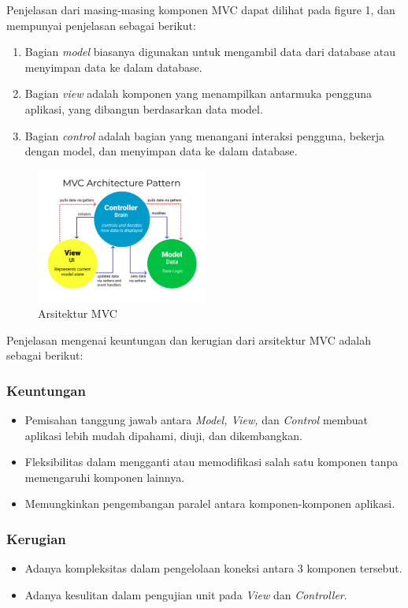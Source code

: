 \documentclass[conference]{IEEEtran}
\begin{document}
	Penjelasan dari masing-masing komponen MVC dapat dilihat pada figure 1, dan mempunyai penjelasan sebagai berikut:
	\begin{enumerate}[label=\alph*]
		\item Bagian \textit{model} biasanya digunakan untuk mengambil data dari database atau menyimpan data ke dalam database. 
		\item Bagian \textit{view} adalah komponen yang menampilkan antarmuka pengguna aplikasi, yang dibangun berdasarkan data model. 
		\item Bagian \textit{control} adalah bagian yang menangani interaksi pengguna, bekerja dengan model, dan menyimpan data ke dalam database.
	\end{enumerate}
	
	\begin{figure}[h]
		\centering
		\includegraphics[width=0.5\textwidth]{images/MVC3}
		\caption{Arsitektur MVC}
		\label{fig:class_mvvm}
	\end{figure}
	
	Penjelasan mengenai keuntungan dan kerugian dari arsitektur MVC adalah sebagai berikut:
	\subsubsection{Keuntungan}
	\begin{itemize}
		\item Pemisahan tanggung jawab antara \textit{Model, View,} dan \textit{Control} membuat aplikasi lebih mudah dipahami, diuji, dan dikembangkan.
		\item Fleksibilitas dalam mengganti atau memodifikasi salah satu komponen tanpa memengaruhi komponen lainnya.
		\item Memungkinkan pengembangan paralel antara komponen-komponen aplikasi.
	\end{itemize}
	\subsubsection{Kerugian}
	\begin{itemize}
		\item Adanya kompleksitas dalam pengelolaan koneksi antara 3 komponen tersebut.
		\item Adanya kesulitan dalam pengujian unit pada \textit{View} dan \textit{Controller}.
	\end{itemize}
	
\end{document}
